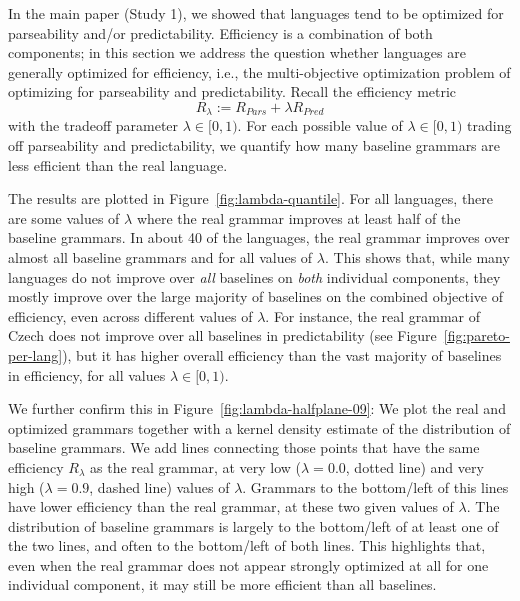 \documentclass[10pt,twoside,lineno]{article}
\begin{document}

In the main paper (Study 1), we showed that languages tend to be optimized for parseability and/or predictability.
Efficiency is a combination of both components; in this section we address the question whether languages are generally optimized for efficiency, i.e., the multi-objective optimization problem of optimizing for parseability and predictability.
Recall the efficiency metric
\begin{equation}
	R_\lambda := R_{Pars} + \lambda R_{Pred}
\end{equation}
with the tradeoff parameter $\lambda \in [0,1)$.
For each possible value of $\lambda \in [0,1)$ trading off parseability and predictability, we quantify how many baseline grammars are less efficient than the real language.

The results are plotted in Figure~\ref{fig:lambda-quantile}.
For all languages, there are some values of $\lambda$ where the real grammar improves at least half of the baseline grammars.
In about 40 of the languages, the real grammar improves over almost all baseline grammars and for all values of $\lambda$.
This shows that, while many languages do not improve over \emph{all} baselines on \emph{both} individual components, they mostly improve over the large majority of baselines on the combined objective of efficiency, even across different values of $\lambda$.
For instance, the real grammar of Czech does not improve over all baselines in predictability (see Figure~\ref{fig:pareto-per-lang}), but it has higher overall efficiency than the vast majority of baselines in efficiency, for all values $\lambda \in [0,1)$.


We further confirm this in Figure~\ref{fig:lambda-halfplane-09}:
We plot the real and optimized grammars together with a kernel density estimate of the distribution of baseline grammars.
We add lines connecting those points that have the same efficiency $R_\lambda$ as the real grammar, at very low ($\lambda = 0.0$, dotted line) and very high ($\lambda = 0.9$, dashed line) values of $\lambda$.
Grammars to the bottom/left of this lines have lower efficiency than the real grammar, at these two given values of $\lambda$.
The distribution of baseline grammars is largely to the bottom/left of at least one of the two lines, and often to the bottom/left of both lines.
This highlights that, even when the real grammar does not appear strongly optimized at all for one individual component, it may still be more efficient than all baselines.
\end{document}
